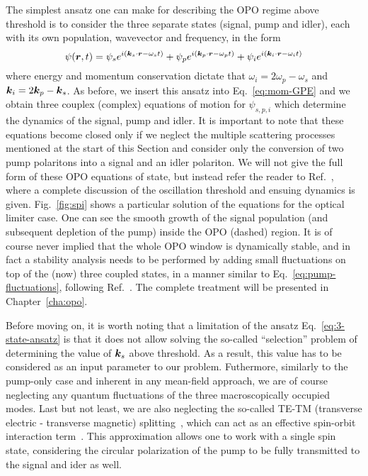 The simplest ansatz one can make for describing the OPO regime above
threshold is to consider the three separate states (signal, pump and
idler), each with its own population, wavevector and frequency, in the
form~\cite{Ciuti_2000,Whittaker2001,Whittaker_2005,Gippius2004}
%
\begin{equation}\label{eq:3-state-ansatz}
  \psi(\bm{r},t) = \psi_s e^{i (\bm{k}_s \cdot \bm{r}- \omega_s t)} + \psi_p e^{i (\bm{k}_p \cdot \bm{r}- \omega_p t)} + \psi_i e^{i (\bm{k}_i \cdot \bm{r}- \omega_i t)}
\end{equation}
% 
where energy and momentum conservation dictate that
$\omega_i = 2\omega_p - \omega_s$ and $\bm{k}_i = 2\bm{k}_p - \bm{k}_s$. As
before, we insert this ansatz into Eq.~\eqref{eq:mom-GPE} and we
obtain three couplex (complex) equations of motion for $\psi_{s,p,i}$
which determine the dynamics of the signal, pump and idler. It is
important to note that these equations become closed only if we
neglect the multiple scattering processes mentioned at the start of
this Section and consider only the conversion of two pump polaritons
into a signal and an idler polariton. We will not give the full form
of these OPO equations of state, but instead refer the reader to
Ref.~\cite{Wouters_2007_b}, where a complete discussion of the
oscillation threshold and ensuing dynamics is
given. Fig.~\ref{fig:spi} shows a particular solution of the equations
for the optical limiter case. One can see the smooth growth of the
signal population (and subsequent depletion of the pump) inside the
OPO (dashed) region. It is of course never implied that the whole OPO
window is dynamically stable, and in fact a stability analysis needs
to be performed by adding small fluctuations on top of the (now) three
coupled states, in a manner similar to
Eq.~\eqref{eq:pump-fluctuations}, following
Ref.~\cite{Wouters_2007}. The complete treatment will be presented in
Chapter~\ref{cha:opo}.  

Before moving on, it is worth noting that a limitation of the ansatz
Eq.~\eqref{eq:3-state-ansatz} is that it does not allow solving the
so-called ``selection'' problem of determining the value of $\bm{k}_s$
above threshold. As a result, this value has to be considered as an
input parameter to our problem. Futhermore, similarly to the pump-only
case and inherent in any mean-field approach, we are of course
neglecting any quantum fluctuations of the three macroscopically
occupied modes. Last but not least, we are also neglecting the
so-called TE-TM (transverse electric - transverse magnetic)
splitting~\cite{Panzarini1999}, which can act as an effective
spin-orbit interaction term~\cite{Kavokin2004}. This approximation
allows one to work with a single spin state, considering the circular
polarization of the pump to be fully transmitted to the signal and
ider as well.

